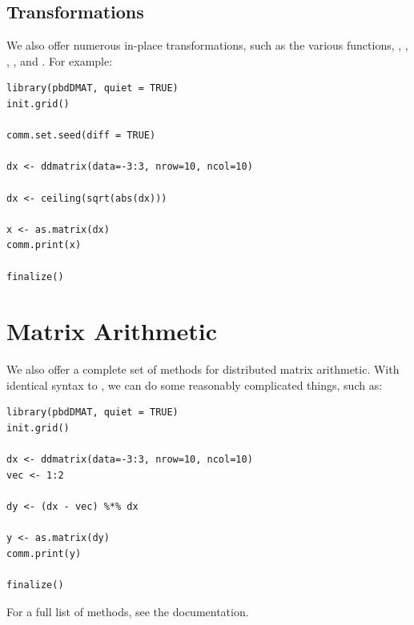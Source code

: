 \subsection{Transformations}

We also offer numerous in-place transformations, such as the various  functions, , , , , and .  For example:

\begin{lstlisting}[language=rr,title=Transformations]
library(pbdDMAT, quiet = TRUE)
init.grid()

comm.set.seed(diff = TRUE)

dx <- ddmatrix(data=-3:3, nrow=10, ncol=10)

dx <- ceiling(sqrt(abs(dx)))

x <- as.matrix(dx)
comm.print(x)

finalize()
\end{lstlisting}





\section{Matrix Arithmetic}

We also offer a complete set of methods for distributed matrix arithmetic.  With identical syntax to , we can do some reasonably complicated things, such as:

\begin{lstlisting}[language=rr,title=Transformations]
library(pbdDMAT, quiet = TRUE)
init.grid()

dx <- ddmatrix(data=-3:3, nrow=10, ncol=10)
vec <- 1:2

dy <- (dx - vec) %*% dx

y <- as.matrix(dy)
comm.print(y)

finalize()
\end{lstlisting}

For a full list of methods, see the  documentation.


